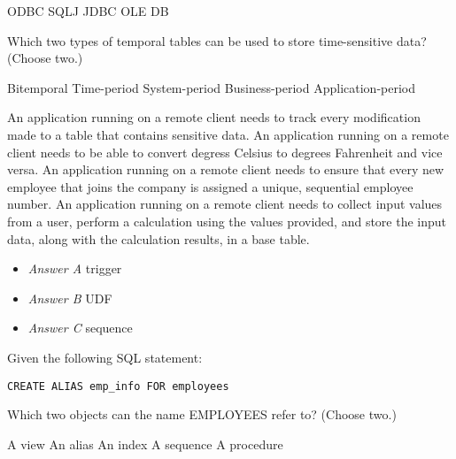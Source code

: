 \documentclass[answers, 11pt]{exam}
\begin{document}
\begin{questions}
\begin{choices}
	\choice ODBC
	\choice SQLJ
	\CorrectChoice JDBC
	\choice OLE DB
\end{choices}

\question[1]
Which two types of temporal tables can be used to store time-sensitive data? (Choose two.)
\begin{choices}
	\CorrectChoice Bitemporal
	\choice Time-period
	\choice System-period
	\choice Business-period
	\CorrectChoice Application-period
\end{choices}

\newpage
{}
\begin{choices}
	\choice An application running on a remote client needs to track every modification made to a 
	table that contains sensitive data.
	\choice An application running on a remote client needs to be able to convert degress Celsius to degrees
	Fahrenheit and vice versa.
	\choice An application running on a remote client needs to ensure that every new employee that joins the 
	company is assigned a unique, sequential employee number.
	\CorrectChoice An application running on a remote client needs to collect input values from a user, 
	perform a calculation using the values provided, and store the input data, along with the calculation
	results, in a base table.
\end{choices}

\begin{solution}
	\begin{itemize}
		\item \textit{Answer A} trigger
		\item \textit{Answer B} UDF
		\item \textit{Answer C} sequence
	\end{itemize}
\end{solution}

\question[1]
Given the following SQL statement:
\begin{verbatim}
CREATE ALIAS emp_info FOR employees
\end{verbatim}
Which two objects can the name EMPLOYEES refer to? (Choose two.)
\begin{choices}
	\CorrectChoice A view
	\CorrectChoice An alias
	\choice An index
	\choice A sequence
	\choice A procedure
\end{choices}


\end{questions}
\end{document}
